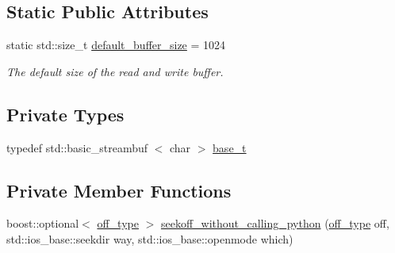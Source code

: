 \subsection*{\-Static \-Public \-Attributes}
\begin{DoxyCompactItemize}
\item 
static std\-::size\-\_\-t \hyperlink{classecto_1_1py_1_1streambuf_a7a20a01fb9aeda8677b3c65bccd6b59d}{default\-\_\-buffer\-\_\-size} = 1024
\begin{DoxyCompactList}\small\item\em \-The default size of the read and write buffer. \end{DoxyCompactList}\end{DoxyCompactItemize}
\subsection*{\-Private \-Types}
\begin{DoxyCompactItemize}
\item 
typedef std\-::basic\-\_\-streambuf\*
$<$ char $>$ \hyperlink{classecto_1_1py_1_1streambuf_ac46c69e7d213fec69f80d1943389366c}{base\-\_\-t}
\end{DoxyCompactItemize}
\subsection*{\-Private \-Member \-Functions}
\begin{DoxyCompactItemize}
\item 
boost\-::optional$<$ \hyperlink{classecto_1_1py_1_1streambuf_aa01772d1599fc51089a209a69fcab7c7}{off\-\_\-type} $>$ \hyperlink{classecto_1_1py_1_1streambuf_a367a7e20642d4a3ebcefd2f6abc3c3e6}{seekoff\-\_\-without\-\_\-calling\-\_\-python} (\hyperlink{classecto_1_1py_1_1streambuf_aa01772d1599fc51089a209a69fcab7c7}{off\-\_\-type} off, std\-::ios\-\_\-base\-::seekdir way, std\-::ios\-\_\-base\-::openmode which)
\end{DoxyCompactItemize}
